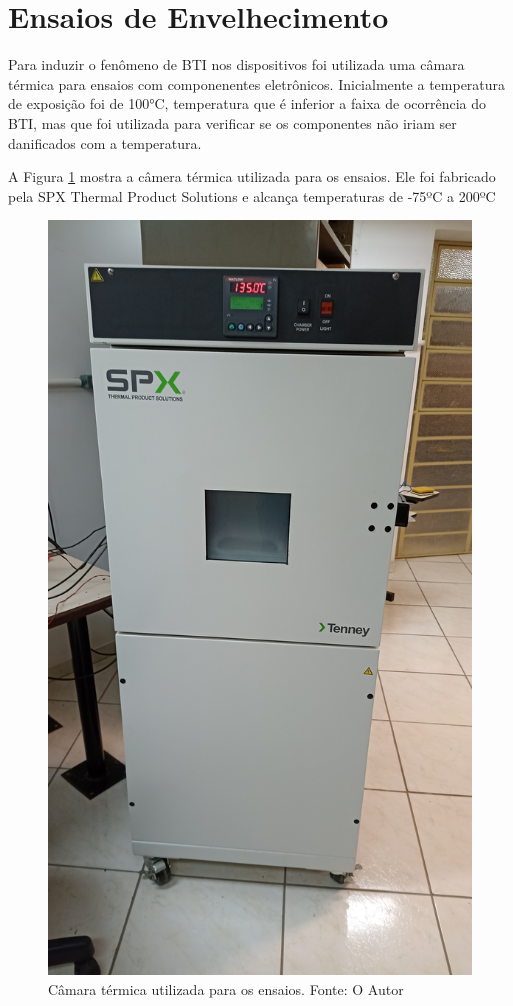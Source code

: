 \section{Ensaios de Envelhecimento}

Para induzir o fenômeno de BTI nos dispositivos foi utilizada uma câmara térmica para ensaios com componenentes eletrônicos. Inicialmente a temperatura de exposição foi de 100°C, temperatura que é inferior a faixa de ocorrência do BTI, mas que foi utilizada para verificar se os componentes não iriam ser danificados com a temperatura.

A Figura \ref{fig:CamTerm} mostra a câmera térmica utilizada para os ensaios. Ele foi fabricado pela SPX Thermal Product Solutions e alcança temperaturas de -75ºC a 200ºC

\begin{figure}[H]
    \centering
    \includegraphics[angle=270, scale=0.08]{figures/Ensaios_CamaraTermica.jpg}
    \caption{Câmara térmica utilizada para os ensaios. Fonte: O Autor}
    \label{fig:CamTerm}
\end{figure}

